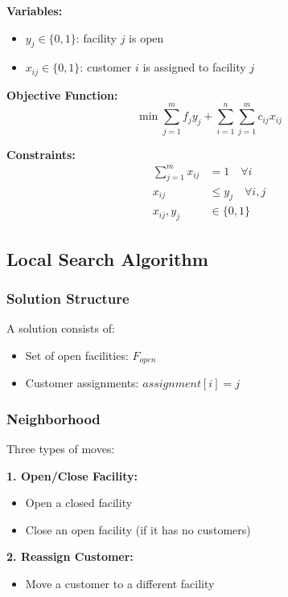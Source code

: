 \documentclass[12pt,a4paper]{article}
\begin{document}
\textbf{Variables:}
\begin{itemize}
    \item $y_j \in \{0,1\}$: facility $j$ is open
    \item $x_{ij} \in \{0,1\}$: customer $i$ is assigned to facility $j$
\end{itemize}

\textbf{Objective Function:}
\begin{equation}
\min \sum_{j=1}^{m} f_j y_j + \sum_{i=1}^{n} \sum_{j=1}^{m} c_{ij} x_{ij}
\end{equation}

\textbf{Constraints:}
\begin{align}
\sum_{j=1}^{m} x_{ij} &= 1 \quad \forall i \\
x_{ij} &\leq y_j \quad \forall i,j \\
x_{ij}, y_j &\in \{0,1\}
\end{align}

\subsection{Local Search Algorithm}

\subsubsection{Solution Structure}

A solution consists of:
\begin{itemize}
    \item Set of open facilities: $F_{open}$
    \item Customer assignments: $assignment[i] = j$
\end{itemize}

\subsubsection{Neighborhood}

Three types of moves:

\textbf{1. Open/Close Facility:}
\begin{itemize}
    \item Open a closed facility
    \item Close an open facility (if it has no customers)
\end{itemize}

\textbf{2. Reassign Customer:}
\begin{itemize}
    \item Move a customer to a different facility
\end{itemize}
\end{document}
